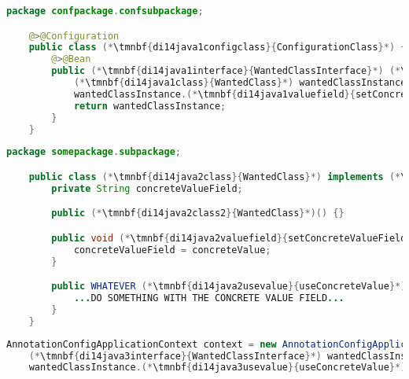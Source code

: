 \begin{lstlisting}[language=Java, title={Configuration class}]
    package confpackage.confsubpackage;

    @>@Configuration
    public class (*\tmnbf{di14java1configclass}{ConfigurationClass}*) {
        @>@Bean
        public (*\tmnbf{di14java1interface}{WantedClassInterface}*) (*\tmnbf{di14java1beanid}{wantedBeanMethod}*)() {
            (*\tmnbf{di14java1class}{WantedClass}*) wantedClassInstance = new (*\tmnbf{di14java1class2}{WantedClass}*)();
            wantedClassInstance.(*\tmnbf{di14java1valuefield}{setConcreteValueField}*)("someValue");
            return wantedClassInstance;
        }
    }
\end{lstlisting}
\begin{lstlisting}[language=Java, title={Wanted class with the zero--parameter constructor and the setter method}]
    package somepackage.subpackage;

    public class (*\tmnbf{di14java2class}{WantedClass}*) implements (*\tmnbf{di14java2interface}{WantedClassInterface}*) {
        private String concreteValueField;

        public (*\tmnbf{di14java2class2}{WantedClass}*)() {}

        public void (*\tmnbf{di14java2valuefield}{setConcreteValueField}*)(String concreteValue) {
            concreteValueField = concreteValue;
        }

        public WHATEVER (*\tmnbf{di14java2usevalue}{useConcreteValue}*)() {
            ...DO SOMETHING WITH THE CONCRETE VALUE FIELD...
        }
    }
\end{lstlisting}
\begin{lstlisting}[language=Java, title={Usage}]
    AnnotationConfigApplicationContext context = new AnnotationConfigApplicationContext((*\tmnbf{di14java3configclass}{ConfigurationClass}*).class);
    (*\tmnbf{di14java3interface}{WantedClassInterface}*) wantedClassInstance = context.getBean("(*\tmnbf{di14java3beanid}{wantedBeanMethod}[ForestGreen]*)", (*\tmnbf{di14java3interface2}{WantedClassInterface}*).class);
    wantedClassInstance.(*\tmnbf{di14java3usevalue}{useConcreteValue}*)();
\end{lstlisting}
\newpage
